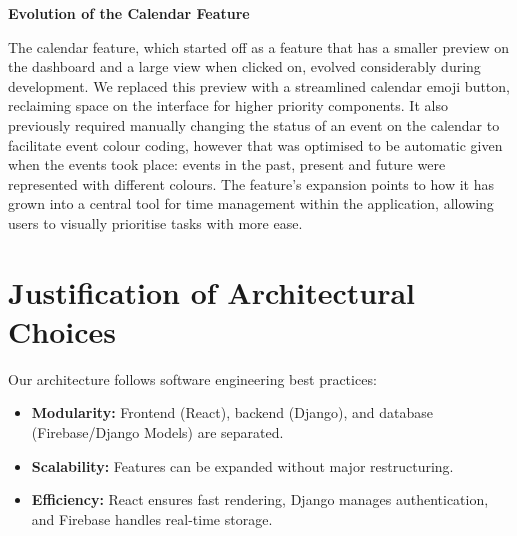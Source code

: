 \textbf{Evolution of the Calendar Feature}

The calendar feature, which started off as a feature that has a smaller preview on the dashboard and a large view when clicked on, evolved considerably during development. We replaced this preview with a streamlined calendar emoji button, reclaiming space on the interface for higher priority components. It also previously required manually changing the status of an event on the calendar to facilitate event colour coding, however that was optimised to be automatic given when the events took place: events in the past, present and future were represented with different colours. The feature's expansion points to how it has grown into a central tool for time management within the application, allowing users to visually prioritise tasks with more ease.

\section{Justification of Architectural Choices}
\label{sect:justification}
Our architecture follows software engineering best practices:
\begin{itemize}
    \item \textbf{Modularity:} Frontend (React), backend (Django), and database (Firebase/Django Models) are separated.
    \item \textbf{Scalability:} Features can be expanded without major restructuring.
    \item \textbf{Efficiency:} React ensures fast rendering, Django manages authentication, and Firebase handles real-time storage.
\end{itemize}
